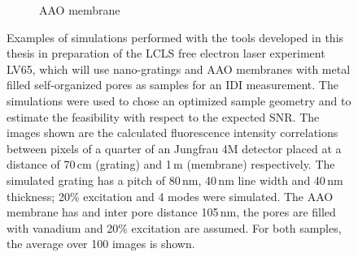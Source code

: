\begin{figure}
\begin{subfigure}[b]{0.37\textwidth}
		\caption{AAO membrane  }
		\label{fig:outlook_aao}
	\end{subfigure}
	\caption[Simulations in Preparation of LV65 Experiment]{Examples of simulations performed with the tools developed in this thesis in preparation of the LCLS free electron laser experiment LV65, which will use nano-gratings and AAO membranes with metal filled self-organized pores as samples for an IDI measurement. The simulations were used to chose an optimized sample geometry and to estimate the feasibility with respect to the expected SNR. The images shown are the calculated fluorescence intensity correlations between pixels of a quarter of an Jungfrau 4M detector placed at a distance of 70\,cm (grating) and 1\,m (membrane) respectively. The simulated grating has a pitch of 80\,nm, 40\,nm line width and 40\,nm thickness; 20\% excitation and 4 modes were simulated. The AAO membrane has and inter pore distance 105\,nm, the pores are filled with vanadium and 20\% excitation are assumed. For both samples, the average over 100 images is shown.}
\end{figure}
